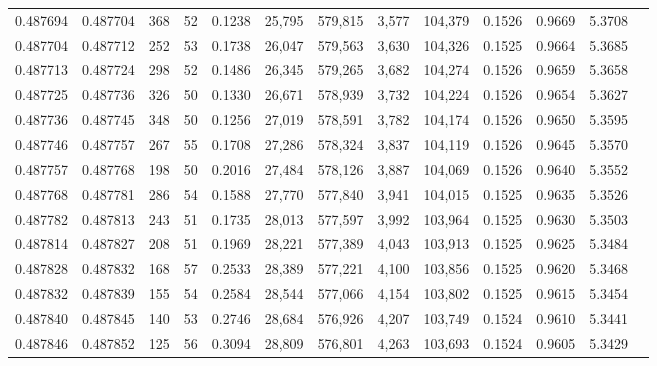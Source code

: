 \begin{tabular}{rrrrrrrrrrrrr}
0.487694 & 0.487704 & 368 &  52 &                                     0.1238 &  25,795 & 579,815 &   3,577 & 104,379 & 0.1526 & 0.9669 & 5.3708 \\
0.487704 & 0.487712 & 252 &  53 &                                     0.1738 &  26,047 & 579,563 &   3,630 & 104,326 & 0.1525 & 0.9664 & 5.3685 \\
0.487713 & 0.487724 & 298 &  52 &                                     0.1486 &  26,345 & 579,265 &   3,682 & 104,274 & 0.1526 & 0.9659 & 5.3658 \\
0.487725 & 0.487736 & 326 &  50 &                                     0.1330 &  26,671 & 578,939 &   3,732 & 104,224 & 0.1526 & 0.9654 & 5.3627 \\
0.487736 & 0.487745 & 348 &  50 &                                     0.1256 &  27,019 & 578,591 &   3,782 & 104,174 & 0.1526 & 0.9650 & 5.3595 \\
0.487746 & 0.487757 & 267 &  55 &                                     0.1708 &  27,286 & 578,324 &   3,837 & 104,119 & 0.1526 & 0.9645 & 5.3570 \\
0.487757 & 0.487768 & 198 &  50 &                                     0.2016 &  27,484 & 578,126 &   3,887 & 104,069 & 0.1526 & 0.9640 & 5.3552 \\
0.487768 & 0.487781 & 286 &  54 &                                     0.1588 &  27,770 & 577,840 &   3,941 & 104,015 & 0.1525 & 0.9635 & 5.3526 \\
0.487782 & 0.487813 & 243 &  51 &                                     0.1735 &  28,013 & 577,597 &   3,992 & 103,964 & 0.1525 & 0.9630 & 5.3503 \\
0.487814 & 0.487827 & 208 &  51 &                                     0.1969 &  28,221 & 577,389 &   4,043 & 103,913 & 0.1525 & 0.9625 & 5.3484 \\
0.487828 & 0.487832 & 168 &  57 &                                     0.2533 &  28,389 & 577,221 &   4,100 & 103,856 & 0.1525 & 0.9620 & 5.3468 \\
0.487832 & 0.487839 & 155 &  54 &                                     0.2584 &  28,544 & 577,066 &   4,154 & 103,802 & 0.1525 & 0.9615 & 5.3454 \\
0.487840 & 0.487845 & 140 &  53 &                                     0.2746 &  28,684 & 576,926 &   4,207 & 103,749 & 0.1524 & 0.9610 & 5.3441 \\
0.487846 & 0.487852 & 125 &  56 &                                     0.3094 &  28,809 & 576,801 &   4,263 & 103,693 & 0.1524 & 0.9605 & 5.3429 \\

\end{tabular}
